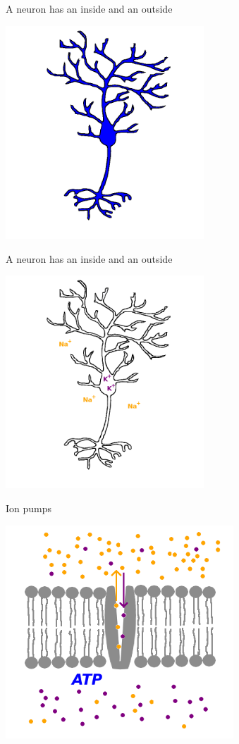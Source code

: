 \documentclass{beamer}
\begin{document}
\begin{frame}{A neuron has an inside and an outside}
  \begin{center}
    \includegraphics[height=8cm]{neuron_filled.png}
  \end{center}
\end{frame}

\begin{frame}{A neuron has an inside and an outside}
  \begin{center}
    \includegraphics[height=8cm]{ions.png}
  \end{center}
\end{frame}


\begin{frame}{Ion pumps}
  \begin{center}
    \includegraphics[height=8cm]{ion_pump_1.png}
  \end{center}
\end{frame}
\end{document}

